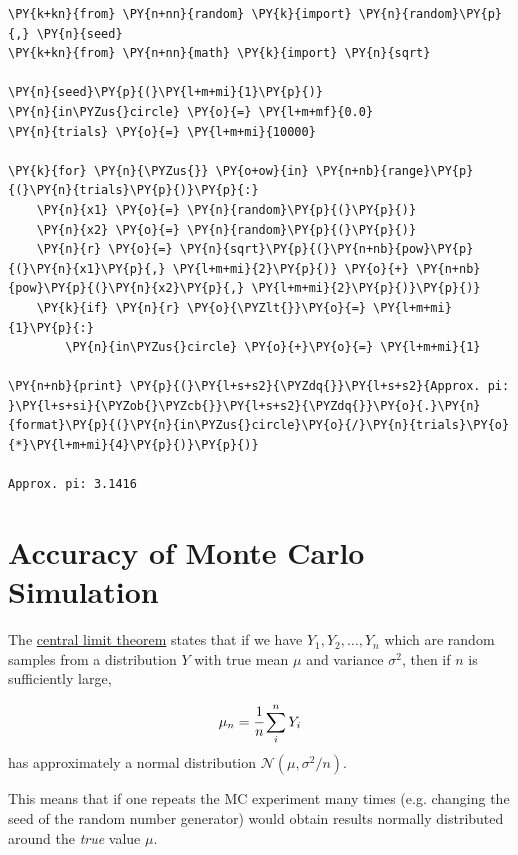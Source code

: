 \begin{tcolorbox}[breakable, size=fbox, boxrule=1pt, pad at break*=1mm,colback=cellbackground, colframe=cellborder]
\begin{Verbatim}[commandchars=\\\{\}]
\PY{k+kn}{from} \PY{n+nn}{random} \PY{k}{import} \PY{n}{random}\PY{p}{,} \PY{n}{seed}
\PY{k+kn}{from} \PY{n+nn}{math} \PY{k}{import} \PY{n}{sqrt}
	
\PY{n}{seed}\PY{p}{(}\PY{l+m+mi}{1}\PY{p}{)}
\PY{n}{in\PYZus{}circle} \PY{o}{=} \PY{l+m+mf}{0.0}
\PY{n}{trials} \PY{o}{=} \PY{l+m+mi}{10000}
	
\PY{k}{for} \PY{n}{\PYZus{}} \PY{o+ow}{in} \PY{n+nb}{range}\PY{p}{(}\PY{n}{trials}\PY{p}{)}\PY{p}{:}
    \PY{n}{x1} \PY{o}{=} \PY{n}{random}\PY{p}{(}\PY{p}{)}
    \PY{n}{x2} \PY{o}{=} \PY{n}{random}\PY{p}{(}\PY{p}{)}
    \PY{n}{r} \PY{o}{=} \PY{n}{sqrt}\PY{p}{(}\PY{n+nb}{pow}\PY{p}{(}\PY{n}{x1}\PY{p}{,} \PY{l+m+mi}{2}\PY{p}{)} \PY{o}{+} \PY{n+nb}{pow}\PY{p}{(}\PY{n}{x2}\PY{p}{,} \PY{l+m+mi}{2}\PY{p}{)}\PY{p}{)}
    \PY{k}{if} \PY{n}{r} \PY{o}{\PYZlt{}}\PY{o}{=} \PY{l+m+mi}{1}\PY{p}{:}
        \PY{n}{in\PYZus{}circle} \PY{o}{+}\PY{o}{=} \PY{l+m+mi}{1}
	
\PY{n+nb}{print} \PY{p}{(}\PY{l+s+s2}{\PYZdq{}}\PY{l+s+s2}{Approx. pi: }\PY{l+s+si}{\PYZob{}\PYZcb{}}\PY{l+s+s2}{\PYZdq{}}\PY{o}{.}\PY{n}{format}\PY{p}{(}\PY{n}{in\PYZus{}circle}\PY{o}{/}\PY{n}{trials}\PY{o}{*}\PY{l+m+mi}{4}\PY{p}{)}\PY{p}{)}

Approx. pi: 3.1416
\end{Verbatim}
\end{tcolorbox}

\section{Accuracy of Monte Carlo Simulation}

The \href{https://en.wikipedia.org/wiki/Central_limit_theorem}{central limit theorem} states that if we have
\(Y_1, Y_2,\dots, Y_n\) which are random samples from a distribution
\(Y\) with true mean \(\mu\) and variance \(\sigma^{2}\), then if \(n\)
is sufficiently large,

\[ \mu_n = \cfrac{1}{n}\sum_i^n Y_i \] has approximately a normal
distribution \(\mathcal{N}(\mu, \sigma^2/n)\).

This means that if one repeats the MC experiment many times 
(e.g. changing the seed of the random number generator) would obtain results normally distributed around the \emph{true} value \(\mu\).

